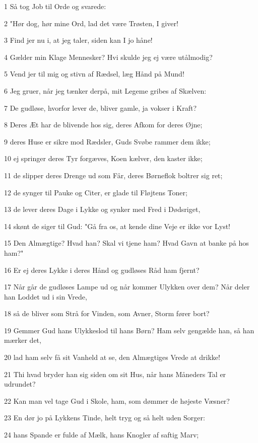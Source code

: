\par 1 Så tog Job til Orde og svarede:
\par 2 "Hør dog, hør mine Ord, lad det være Trøsten, I giver!
\par 3 Find jer nu i, at jeg taler, siden kan I jo håne!
\par 4 Gælder min Klage Mennesker? Hvi skulde jeg ej være utålmodig?
\par 5 Vend jer til mig og stivn af Rædsel, læg Hånd på Mund!
\par 6 Jeg gruer, når jeg tænker derpå, mit Legeme gribes af Skælven:
\par 7 De gudløse, hvorfor lever de, bliver gamle, ja vokser i Kraft?
\par 8 Deres Æt har de blivende hos sig, deres Afkom for deres Øjne;
\par 9 deres Huse er sikre mod Rædsler, Guds Svøbe rammer dem ikke;
\par 10 ej springer deres Tyr forgæves, Koen kælver, den kaster ikke;
\par 11 de slipper deres Drenge ud som Får, deres Børneflok boltrer sig ret;
\par 12 de synger til Pauke og Citer, er glade til Fløjtens Toner;
\par 13 de lever deres Dage i Lykke og synker med Fred i Dødsriget,
\par 14 skønt de siger til Gud: "Gå fra os, at kende dine Veje er ikke vor Lyst!
\par 15 Den Almægtige? Hvad han? Skal vi tjene ham? Hvad Gavn at banke på hos ham?"
\par 16 Er ej deres Lykke i deres Hånd og gudløses Råd ham fjernt?
\par 17 Når går de gudløses Lampe ud og når kommer Ulykken over dem? Når deler han Loddet ud i sin Vrede,
\par 18 så de bliver som Strå for Vinden, som Avner, Storm fører bort?
\par 19 Gemmer Gud hans Ulykkeslod til hans Børn? Ham selv gengælde han, så han mærker det,
\par 20 lad ham selv få sit Vanheld at se, den Almægtiges Vrede at drikke!
\par 21 Thi hvad bryder han sig siden om sit Hus, når hans Måneders Tal er udrundet?
\par 22 Kan man vel tage Gud i Skole, ham, som dømmer de højeste Væsner?
\par 23 En dør jo på Lykkens Tinde, helt tryg og så helt uden Sorger:
\par 24 hans Spande er fulde af Mælk, hans Knogler af saftig Marv;
